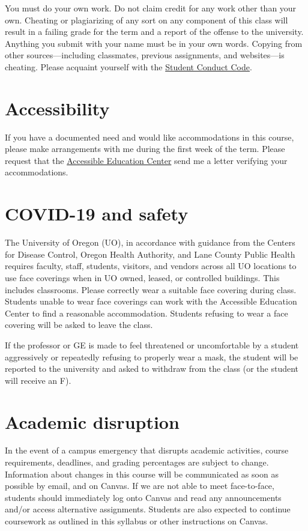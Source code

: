 \documentclass[10pt]{article}
\begin{document}
You must do your own work. Do not claim credit for any work other than your own. Cheating or plagiarizing of any sort on any component of this class will result in a failing grade for the term and a report of the offense to the university. Anything you submit with your name must be in your own words. Copying from other sources---including classmates, previous assignments, and websites---is cheating. Please acquaint yourself with the \href{http://studentlife.uoregon.edu}{Student Conduct Code}.

\section*{Accessibility}

If you have a documented need and would like accommodations in this course, please make arrangements with me during the first week of the term. Please request that the \href{https://aec.uoregon.edu/}{Accessible Education Center} send me a letter verifying your accommodations.

\section*{COVID-19 and safety}

The University of Oregon (UO), in accordance with guidance from the Centers for Disease Control, Oregon Health
Authority, and Lane County Public Health requires faculty, staff, students, visitors, and vendors across all UO locations to use face coverings when in UO owned, leased, or controlled buildings. This includes classrooms. Please correctly wear a suitable face covering during class. Students unable to wear face coverings can work with the Accessible Education Center to find a reasonable accommodation. Students refusing to wear a face covering will be asked to leave the class. 

If the professor or GE is made to feel threatened or uncomfortable by a student aggressively or repeatedly refusing to properly wear a mask, the student will be reported to the university and asked to withdraw from the class (or the student will receive an F).

\section*{Academic disruption}

In the event of a campus emergency that disrupts academic activities, course requirements, deadlines, and grading
percentages are subject to change. Information about changes in this course will be communicated as soon as possible by email, and on Canvas. If we are not able to meet face-to-face, students should immediately log onto Canvas and read any announcements and/or access alternative assignments. Students are also expected to continue coursework as outlined in this syllabus or other instructions on Canvas.
\end{document}

